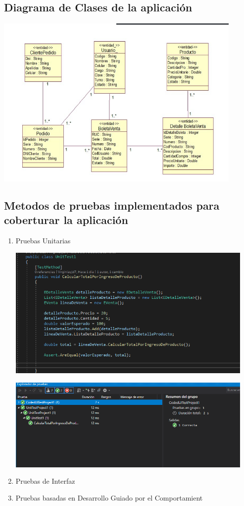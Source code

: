 \documentclass[preprint,12pt]{elsarticle}
\begin{document}
\subsection{\textbf{ Diagrama de Clases de la aplicación }}
\begin{center}
	\includegraphics[width=12cm]{./imagen/diagrmclasesvistaprocesos} 
	\end{center}
\subsection{\textbf{  Metodos de pruebas implementados para coberturar la aplicación }}
\renewcommand{\labelenumi}{{\theenumi})}
\begin{enumerate}
\item  Pruebas Unitarias  
\begin{center}
	\includegraphics[width=12cm]{./imagen/calcular} 
	\end{center}
\begin{center}
	\includegraphics[width=12cm]{./imagen/pruebas} 
	\end{center}
\item  Pruebas de Interfaz  
\item Pruebas basadas en Desarrollo Guiado por el Comportamient
\end{enumerate}

	\newpage
	
		
\end{document}

